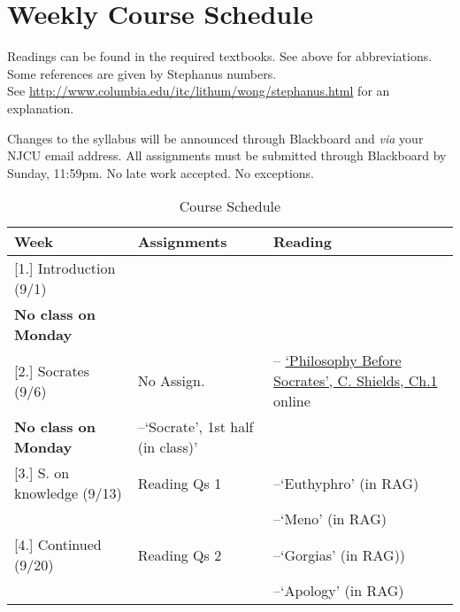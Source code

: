 \documentclass[article,oneside]{memoir}
\begin{document}
\section{Weekly Course Schedule}
Readings can be found in the required textbooks. See above for abbreviations. Some references are given by Stephanus numbers.\\ See \href{http://www.columbia.edu/itc/lithum/wong/stephanus.html}{http://www.columbia.edu/itc/lithum/wong/stephanus.html} for an explanation. 

 Changes to the syllabus will be announced through Blackboard and \emph{via} your NJCU email address.  All assignments must be submitted through Blackboard by Sunday, 11:59pm. No late work accepted. No exceptions.   \newline

\begin{center}
\begin{longtable}{p{4.5cm}p{2cm}p{4.5cm}}
 
  \caption{Course Schedule} \\
  \toprule
  \textbf{Week} &\textbf{Assignments} & \textbf{Reading} \\
  \midrule

  

[1.] Introduction (9/1)	&  		&  \\  


\textbf{No class on Monday}	&					 &    \\ [1.8\baselineskip] \hline

[2.] Socrates (9/6)	  		& No Assign.			& -- \href{https://scottoconnor.org/ancient/Shields2.pdf}{`Philosophy Before Socrates', C. Shields, Ch.1} online  \\
\textbf{No class on Monday} 	& 	--`Socrate', 1st half (in class)'				 &  \\ [1.8\baselineskip] \hline



[3.] S. on knowledge (9/13)	& Reading Qs 1		& --`Euthyphro'  (in RAG)   \\ 
						&					& --`Meno'  (in RAG) \\[1.8\baselineskip]  \hline %



[4.] Continued (9/20)			& Reading Qs 2		& --`Gorgias' (in RAG)) \\
			        			&			  		&  --`Apology' (in RAG) \\ [1.8\baselineskip]  \hline %




\end{longtable}
\end{center}
\end{document}
